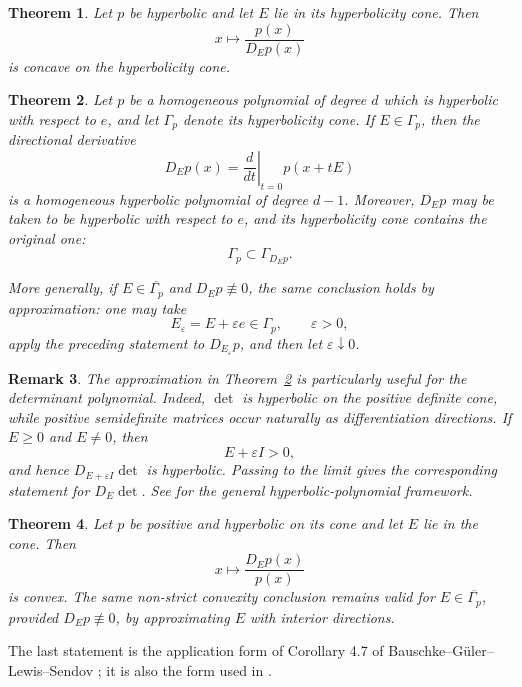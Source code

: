\documentclass{article}
\newtheorem{theorem}{Theorem}[section]
\newtheorem{remark}[theorem]{Remark}
\numberwithin{equation}{section}
\begin{document}
\begin{theorem}\label{thm:garding}
Let $p$ be hyperbolic and let $E$ lie in its hyperbolicity cone. Then
\[
x\longmapsto\frac{p(x)}{D_Ep(x)}
\]
is concave on the hyperbolicity cone.
\end{theorem}

\begin{theorem}
\label{thm:derivhyper}
Let $p$ be a homogeneous polynomial of degree $d$ which is
hyperbolic with respect to $e$, and let $\Gamma_p$ denote its
hyperbolicity cone. If $E\in \Gamma_p$, then the directional
derivative
\[
D_Ep(x)
=
\left.\frac{d}{dt}\right|_{t=0}p(x+tE)
\]
is a homogeneous hyperbolic polynomial of degree $d-1$.
Moreover, $D_Ep$ may be taken to be hyperbolic with respect to
$e$, and its hyperbolicity cone contains the original one:
\[
\Gamma_p\subset \Gamma_{D_Ep}.
\]

More generally, if $E\in\overline{\Gamma_p}$ and
$D_Ep\not\equiv0$, the same conclusion holds by approximation:
one may take
\[
E_\varepsilon=E+\varepsilon e\in\Gamma_p,
\qquad \varepsilon>0,
\]
apply the preceding statement to $D_{E_\varepsilon}p$, and then
let $\varepsilon\downarrow0$.
\end{theorem}

\begin{remark}
\label{rem:boundary-hyperbolic-direction}
The approximation in Theorem~\ref{thm:derivhyper}
is particularly useful for the determinant polynomial. Indeed,
$\det$ is hyperbolic on the positive definite cone, while
positive semidefinite matrices occur naturally as differentiation
directions. If $E\geq0$ and $E\neq0$, then
\[
E+\varepsilon I>0,
\]
and hence $D_{E+\varepsilon I}\det$ is hyperbolic. Passing to the
limit gives the corresponding statement for $D_E\det$.
See \cite{BGLS01,Renegar06} for the general hyperbolic-polynomial
framework.
\end{remark}

\begin{theorem}\label{thm:logderivative}
Let $p$ be positive and hyperbolic on its cone and let $E$ lie in the cone. Then
\[
x\longmapsto\frac{D_Ep(x)}{p(x)}
\]
is convex. The same non-strict convexity conclusion remains valid for $E\in\overline{\Gamma_p}$, provided $D_Ep\not\equiv0$, by
approximating $E$ with interior directions.
\end{theorem}

The last statement is the application form of Corollary 4.7 of Bauschke--G\"uler--Lewis--Sendov \cite{BGLS01}; it is also the form used in \cite{LMS26}.
\end{document}
